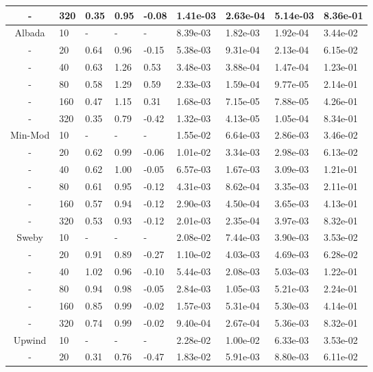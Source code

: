 \begin{table}[p]
{\begin{tabular}{cllllllll}
    - &  320 & 0.35 & 0.95 & -0.08 & 1.41e-03 & 2.63e-04 & 5.14e-03 & 8.36e-01 \\  
   \hline
    Albada &   10 & - & - & - & 8.39e-03 & 1.82e-03 & 1.92e-04 & 3.44e-02  \\ 
    - &   20 & 0.64 & 0.96 & -0.15 & 5.38e-03 & 9.31e-04 & 2.13e-04 & 6.15e-02 \\  
    - &   40 & 0.63 & 1.26 & 0.53 & 3.48e-03 & 3.88e-04 & 1.47e-04 & 1.23e-01  \\ 
    - &   80 & 0.58 & 1.29 & 0.59 & 2.33e-03 & 1.59e-04 & 9.77e-05 & 2.14e-01  \\ 
    - &  160 & 0.47 & 1.15 & 0.31 & 1.68e-03 & 7.15e-05 & 7.88e-05 & 4.26e-01  \\ 
    - &  320 & 0.35 & 0.79 & -0.42 & 1.32e-03 & 4.13e-05 & 1.05e-04 & 8.34e-01 \\  
   \hline
    Min-Mod &   10 & - & - & - & 1.55e-02 & 6.64e-03 & 2.86e-03 & 3.46e-02  \\ 
    - &   20 & 0.62 & 0.99 & -0.06 & 1.01e-02 & 3.34e-03 & 2.98e-03 & 6.13e-02 \\  
    - &   40 & 0.62 & 1.00 & -0.05 & 6.57e-03 & 1.67e-03 & 3.09e-03 & 1.21e-01 \\  
    - &   80 & 0.61 & 0.95 & -0.12 & 4.31e-03 & 8.62e-04 & 3.35e-03 & 2.11e-01 \\  
    - &  160 & 0.57 & 0.94 & -0.12 & 2.90e-03 & 4.50e-04 & 3.65e-03 & 4.13e-01 \\  
    - &  320 & 0.53 & 0.93 & -0.12 & 2.01e-03 & 2.35e-04 & 3.97e-03 & 8.32e-01 \\  
   \hline
    Sweby &   10 & - & - & - & 2.08e-02 & 7.44e-03 & 3.90e-03 & 3.53e-02  \\ 
    - &   20 & 0.91 & 0.89 & -0.27 & 1.10e-02 & 4.03e-03 & 4.69e-03 & 6.28e-02 \\  
    - &   40 & 1.02 & 0.96 & -0.10 & 5.44e-03 & 2.08e-03 & 5.03e-03 & 1.22e-01 \\  
    - &   80 & 0.94 & 0.98 & -0.05 & 2.84e-03 & 1.05e-03 & 5.21e-03 & 2.24e-01 \\  
    - &  160 & 0.85 & 0.99 & -0.02 & 1.57e-03 & 5.31e-04 & 5.30e-03 & 4.14e-01 \\  
    - &  320 & 0.74 & 0.99 & -0.02 & 9.40e-04 & 2.67e-04 & 5.36e-03 & 8.32e-01 \\  
   \hline
    Upwind &   10 & - & - & - & 2.28e-02 & 1.00e-02 & 6.33e-03 & 3.53e-02  \\ 
    - &   20 & 0.31 & 0.76 & -0.47 & 1.83e-02 & 5.91e-03 & 8.80e-03 & 6.11e-02 \\  

\end{tabular}}
\end{table}
